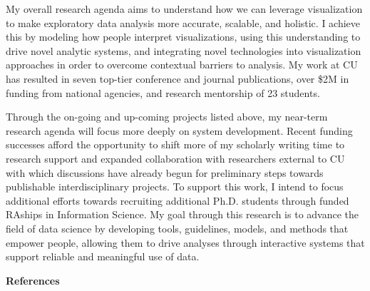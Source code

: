 \documentclass[11pt]{article}
\begin{document}
My overall research agenda aims to understand how we can leverage visualization to make exploratory data analysis more accurate, scalable, and holistic. I achieve this by modeling how people interpret visualizations, using this understanding to drive novel analytic systems, and integrating novel technologies into visualization approaches in order to overcome contextual barriers to analysis. My work at CU has resulted in seven top-tier conference and journal publications, over \$2M in funding from national agencies, and research mentorship of 23 students. 

Through the on-going and up-coming projects listed above, my near-term research agenda will focus more deeply on system development. Recent funding successes afford the opportunity to shift more of my scholarly writing time to research support and expanded collaboration with researchers external to CU with which discussions have already begun for preliminary steps towards publishable interdisciplinary projects. To support this work, I intend to focus additional efforts towards recruiting additional Ph.D. students through funded RAships in Information Science.  
My goal through this research is to advance the field of data science by developing tools, guidelines, models, and methods that empower people, allowing them to drive analyses through interactive systems that support reliable and meaningful use of data.


{
\vspace{4pt}
\noindent
\textbf{References}
\vspace{-36pt}
\renewcommand\refname{\vskip -1cm}
\small


}


\pagebreak
\setcounter{page}{1}
\end{document}
